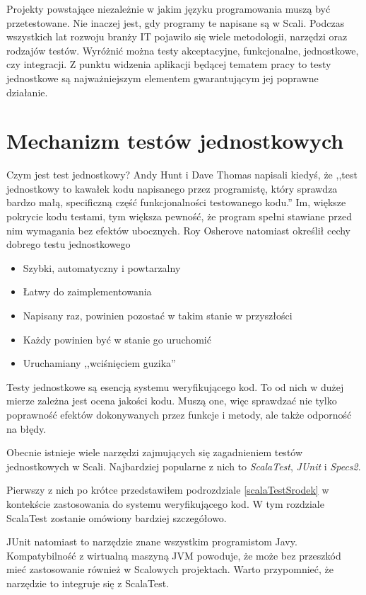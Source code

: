 \documentclass[brudnopis]{xmgr}
\begin{document}
Projekty powstające niezależnie w jakim języku programowania muszą być przetestowane. Nie inaczej jest, gdy programy te napisane są w Scali. Podczas wszystkich lat rozwoju branży IT pojawiło się wiele metodologii, narzędzi oraz rodzajów testów. Wyróżnić można testy akceptacyjne, funkcjonalne, jednostkowe, czy integracji. Z punktu widzenia aplikacji będącej tematem pracy to testy jednostkowe są najważniejszym elementem gwarantującym jej poprawne działanie.       
      
\section{Mechanizm testów jednostkowych}

Czym jest test jednostkowy? Andy Hunt i Dave Thomas napisali kiedyś, że ,,test jednostkowy to kawałek kodu napisanego przez programistę, który sprawdza bardzo małą, specificzną część funkcjonalności testowanego kodu.''\cite[s.3]{Hunt:2003:PUT} Im, większe pokrycie kodu testami, tym większa pewność, że program spełni stawiane przed nim wymagania bez efektów ubocznych. Roy Osherove natomiast określił cechy dobrego testu jednostkowego\cite[s. 6]{Osherove:2009:TAOUT} 

\begin{itemize}
\item Szybki, automatyczny i powtarzalny
\item Łatwy do zaimplementowania
\item Napisany raz, powinien pozostać w takim stanie w przyszłości
\item Każdy powinien być w stanie go uruchomić
\item Uruchamiany ,,wciśnięciem guzika'' 
\end{itemize}

Testy jednostkowe są esencją systemu weryfikującego kod. To od nich w dużej mierze zależna jest ocena jakości kodu. Muszą one, więc sprawdzać nie tylko poprawność efektów dokonywanych przez funkcje i metody, ale także odporność na błędy.  

Obecnie istnieje wiele narzędzi zajmujących się zagadnieniem testów jednostkowych w Scali. Najbardziej popularne z nich to \emph{ScalaTest}, \emph{JUnit} i \emph{Specs2}.

Pierwszy z nich po krótce przedstawiłem podrozdziale \ref{scalaTestSrodek} w kontekście zastosowania do systemu weryfikującego kod. W tym rozdziale ScalaTest zostanie omówiony bardziej szczegółowo. 

JUnit natomiast to narzędzie znane wszystkim programistom Javy. Kompatybilność z wirtualną maszyną JVM powoduje, że może bez przeszkód mieć zastosowanie również w Scalowych projektach. Warto przypomnieć, że narzędzie to integruje się z ScalaTest. 
\end{document}
